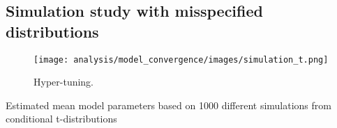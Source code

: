 \subsection{Simulation study with misspecified distributions}

\begin{figure}[H] 
    \centering
    \texttt{[image: analysis/model\_convergence/images/simulation\_t.png]}
    \caption{Hyper-tuning.}
    \label{fig:jump_penalties}
\end{figure}

\begin{table}[H]
\centering
\caption{Estimated mean model parameters based on 1000 different simulations from conditional t-distributions}

\end{table}